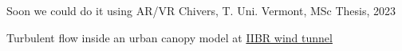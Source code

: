 \begin{frame}[label=app-9]{Soon we could do it using AR/VR}
    Chivers, T. Uni. Vermont, MSc Thesis, 2023
\end{frame}
    
    
\begin{frame}[label=app-811]{Turbulent flow inside an urban canopy model at \href{https://www.dropbox.com/s/9x43i2uk9q38fho/flow_inside_laser.mp4?raw=1}{IIBR wind tunnel}}
\end{frame}
%    

%